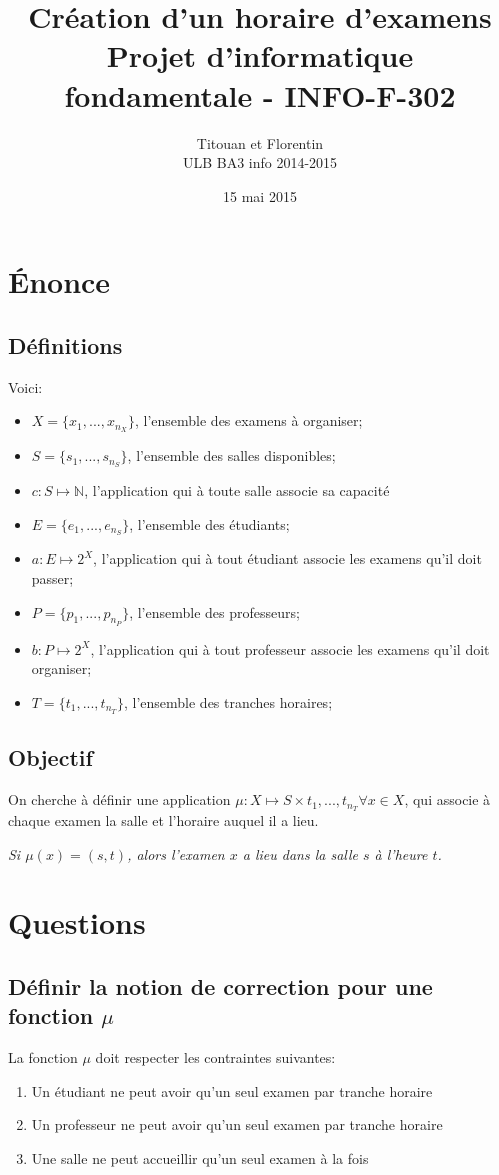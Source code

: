 \documentclass[a4paper]{article}
\title{
    Création d'un horaire d'examens\\
    \small Projet d'informatique fondamentale - INFO-F-302
}
\author{
    Titouan \bsc{Christophe} et Florentin \bsc{Hennecker}\\
    ULB BA3 info 2014-2015
}
\date{15 mai 2015}
\begin{document}
\maketitle
\tableofcontents

\section{\'Enonce}
\subsection{Définitions}

Voici:
\begin{itemize}
  \item $X = \{x_1, ..., x_{n_X}\}$, l'ensemble des examens à organiser;
  \item $S = \{s_1, ..., s_{n_S}\}$, l'ensemble des salles disponibles;
  \item $c : S \mapsto \mathbb{N}$, l'application qui à toute salle associe sa capacité
  \item $E = \{e_1, ..., e_{n_S}\}$, l'ensemble des étudiants;
  \item $a : E \mapsto 2^X$, l'application qui à tout étudiant associe les examens qu'il doit passer;
  \item $P = \{p_1, ..., p_{n_P}\}$, l'ensemble des professeurs;
  \item $b : P \mapsto 2^X$, l'application qui à tout professeur associe les examens qu'il doit organiser;
  \item $T = \{t_1, ..., t_{n_T}\}$, l'ensemble des tranches horaires;
\end{itemize}

\subsection{Objectif}
On cherche à définir une application $\mu : X \mapsto S \times {t_1, ..., t_{n_T}} \forall x \in X$,
qui associe à chaque examen la salle et l'horaire auquel il a lieu.

\textit{Si $\mu(x) = (s,t)$, alors l'examen $x$ a lieu dans la salle $s$ à l'heure $t$.}

\section{Questions}
\subsection{Définir la notion de correction pour une fonction $\mu$}
La fonction $\mu$ doit respecter les contraintes suivantes:
\begin{enumerate}
  \item Un étudiant ne peut avoir qu'un seul examen par tranche horaire
  \item Un professeur ne peut avoir qu'un seul examen par tranche horaire
  \item Une salle ne peut accueillir qu'un seul examen à la fois
\end{enumerate}
\end{document}
